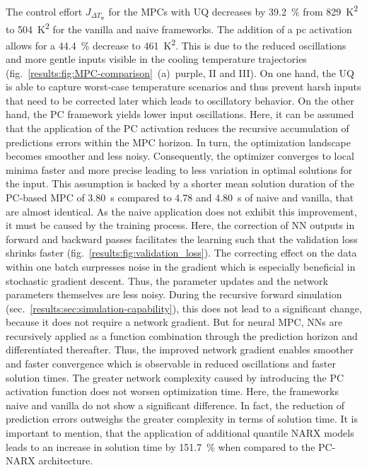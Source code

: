 \noindent
The control effort $J_{\Delta T_\text{w}}$ for the MPCs with UQ decreases by \SI{39.2}{\%} from \SI{829}{\kelvin^2}
to \SI{504}{\kelvin^2} for the vanilla and naive frameworks. The addition of a pc
activation allows for a \SI{44.4}{\%} decrease to \SI{461}{\kelvin^2}.
This is due to the reduced oscillations and more gentle inputs visible in the 
cooling temperature trajectories (fig.~\ref{results:fig:MPC-comparison}~(a)~purple, II and III).
On one hand, the UQ is able to capture worst-case temperature scenarios and thus prevent harsh
inputs that need to be corrected later which leads to oscillatory behavior. On the other hand,
the PC framework yields lower input oscillations. Here, it can be assumed that the application
of the PC activation reduces the recursive accumulation of predictions errors within the MPC
horizon. In turn, the optimization landscape becomes smoother and less noisy. 
Consequently, the optimizer converges to local minima faster and more precise
leading to less variation in optimal solutions for the input.
This assumption is backed by a shorter mean solution duration of the PC-based MPC of \SI{3.80}{\second}
compared to \SI{4.78}{} and \SI{4.80}{\second} of naive and vanilla, that are almost identical.
As the naive application does not exhibit this improvement, it must be caused by the training process.
Here, the correction of NN outputs in forward and backward passes facilitates the learning
such that the validation loss shrinks faster (fig.~\ref{results:fig:validation_loss}).
The correcting effect on the data within one batch surpresses noise in the gradient which
is especially beneficial in stochastic gradient descent. Thus, the parameter updates and the 
network parameters themselves are less noisy. During the recursive forward simulation
(sec.~\ref{results:sec:simulation-capability}), this does not lead to a significant change,
because it does not require a network gradient.
But for neural MPC, NNs are recursively applied as a function combination through the prediction
horizon and differentiated thereafter.
Thus, the improved network gradient enables smoother and faster convergence which is observable 
in reduced oscillations and faster solution times.
\newline
\newline
\noindent
The greater network complexity caused by introducing the PC activation function does not worsen
optimization time. Here, the frameworks naive and vanilla do not show a significant difference.
In fact, the reduction of prediction errors outweighs the greater complexity in terms of
solution time. It is important to mention, that the application of additional quantile NARX models leads 
to an increase in solution time by \SI{151.7}{\%} when compared to the PC-NARX architecture.
